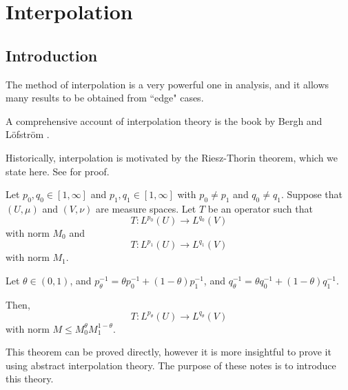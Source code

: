 
\chapter{Interpolation} %

\label{Interpolation} %




\section{Introduction}
The method of interpolation is a very powerful one in analysis,
and it allows many results to be obtained from ``edge" cases.

A comprehensive account of interpolation theory is the book by Bergh and
L\"ofstr\"om \cite{interp}.

Historically, interpolation is motivated by the Riesz-Thorin theorem,
which we state here. See \cite[Section 1.1]{interp} for proof.
\begin{theorem}
    Let $p_0,q_0 \in [1,\infty]$ and $p_1,q_1 \in [1,\infty]$
    with $p_0 \neq p_1$ and $q_0 \neq q_1$. Suppose that $(U,\mu)$
    and $(V,\nu)$ are measure spaces. Let $T$ be an operator such that
    \begin{equation*}
        T:L^{p_0}(U)\rightarrow L^{q_0}(V)
    \end{equation*}
    with norm $M_0$ and
    \begin{equation*}
        T:L^{p_1}(U) \rightarrow L^{q_1}(V)
    \end{equation*}
    with norm $M_1$.
    
    Let $\theta \in (0,1)$, and $p_\theta^{-1} = \theta p_0^{-1}+(1-\theta)p_1^{-1}$,
    and $q_\theta^{-1} = \theta q_0^{-1}+(1-\theta)q_1^{-1}$. 
    
    Then,
    \begin{equation*}
        T:L^{p_\theta}(U)\rightarrow L^{q_\theta}(V)
    \end{equation*}
    with norm $M \leq M_0^{\theta} M_1^{1-\theta}$.
\end{theorem}
This theorem can be proved directly, however it is more insightful to prove it using
abstract interpolation theory. The purpose of these notes is to introduce this theory.


